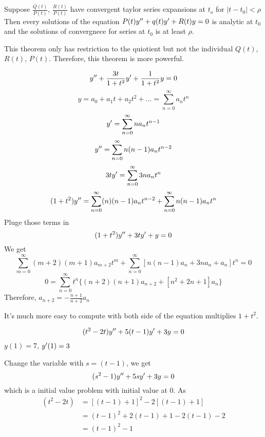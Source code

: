 \begin{theorem}
Suppose $\frac{Q(t)}{P(t)}$, $\frac{R(t)}{P(t)}$ have convergent taylor series expansions at $t_o$ for $|t-t_0|<\rho$ Then every solutions of the equation $P(t)y^{\prime\prime}+q(t)y^{\prime}+R(t)y=0$ is analytic at $t_0$ and the solutions of convergnece for series at $t_0$ is at least $\rho$.
\end{theorem}
\begin{remark}
This theorem only has restriction to the quiotient but not the individual $Q(t)$, $R(t)$, $P(t)$. Therefore, this theorem is more powerful.
\end{remark}
\begin{example}
\[y^{\prime\prime}+\frac{3t}{1+t^2}y^{\prime}+\frac{1}{1+t^2}y=0\]
\[y=a_0+a_1t+a_2t^2+\dots=\sum_{n=0}^{\infty}a_nt^n
\]
\[y^{\prime}=\sum_{n=0}^\infty na_nt^{n-1}
\]
\[y^{\prime\prime}=\sum_{n=0}^{\infty}n(n-1)a_nt^{n-2}
\]
\[3ty^{\prime}=\sum_{n=0}^{\infty}3na_nt^n
\]
\[(1+t^2)y^{\prime\prime}=\sum_{n=0}^\infty(n)(n-1)a_nt^{n-2}+\sum_{n=0}^\infty n(n-1)a_nt^n
\]
Pluge those terms in 
\[(1+t^2)y^{\prime\prime}+3ty^{\prime}+y=0
\]
We get
\[\sum_{m=0}^\infty(m+2)(m+1)a_{m+2}t^m+\sum_{n=0}^\infty[n(n-1)a_n+3na_n+a_n]t^n=0
\]
\[0=\sum_{n=0}^\infty t^n\{(n+2)(n+1)a_{n+2}+[n^2+2n+1]a_n\}
\]
Therefore, $a_{n+2}=-\frac{n+1}{n+2}a_n$
\end{example}
\begin{remark}
It's much more easy to compute with both side of the equation multiplies $1+t^2$.
\end{remark}
\begin{example}
\[(t^2-2t)y^{\prime\prime}+5(t-1)y^{\prime}+3y=0
\]
$y(1)=7$, $y^{\prime}(1)=3$
\end{example}
Change the variable with $s=(t-1)$,
we get
\[(s^2-1)y^{\prime\prime}+5sy^{\prime}+3y=0
\]
which is a initial value problem with initial value at 0.
As \[\begin{aligned}
(t^2-2t)&=[(t-1)+1]^2-2[(t-1)+1]\\
&=(t-1)^2+2(t-1)+1-2(t-1)-2\\
&=(t-1)^2-1
\end{aligned}
\]
